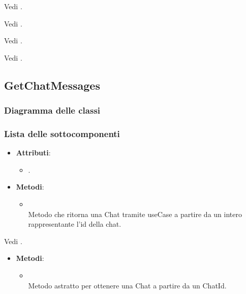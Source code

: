 \documentclass[10pt, a4paper]{article}
\begin{document}
Vedi .

Vedi .

Vedi .

Vedi .


\subsection{GetChatMessages}
\subsubsection{Diagramma delle classi}
\subsubsection{Lista delle sottocomponenti}

\label{GetChatMessagesControllerDettaglio}
\begin{itemize}
    \item \textbf{Attributi}:
    \begin{itemize}
        \item {}.
    \end{itemize}
    \item \textbf{Metodi}:
    \begin{itemize}
        \item {}\\
        Metodo che ritorna una Chat tramite useCase a partire da un intero rappresentante l'id della chat. 
    \end{itemize}
\end{itemize}

Vedi .

\label{GetChatMessagesUseCaseDettaglio}
\begin{itemize}
    \item \textbf{Metodi}:
    \begin{itemize}
        \item {}\\
        Metodo astratto per ottenere una Chat a partire da un ChatId.
    \end{itemize}
\end{itemize}
\end{document}
